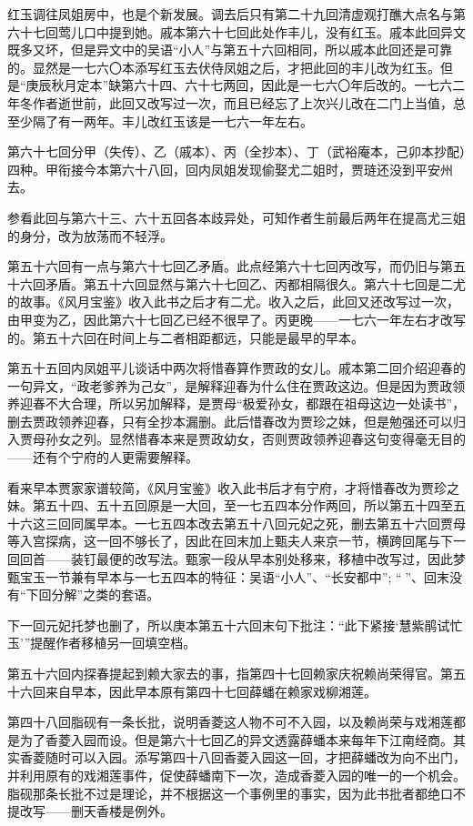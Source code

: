\par 红玉调往凤姐房中，也是个新发展。调去后只有第二十九回清虚观打醮大点名与第六十七回莺儿口中提到她。戚本第六十七回此处作丰儿，没有红玉。戚本此回异文既多又坏，但是异文中的吴语“小人”与第五十六回相同，所以戚本此回还是可靠的。显然是一七六〇本添写红玉去伏侍凤姐之后，才把此回的丰儿改为红玉。但是“庚辰秋月定本”缺第六十四、六十七两回，因此是一七六〇年后改的。一七六二年冬作者逝世前，此回又改写过一次，而且已经忘了上次兴儿改在二门上当值，总至少隔了有一两年。丰儿改红玉该是一七六一年左右。
\par 第六十七回分甲（失传）、乙（戚本）、丙（全抄本）、丁（武裕庵本，己卯本抄配）四种。甲衔接今本第六十八回，回内凤姐发现偷娶尤二姐时，贾琏还没到平安州去。
\par 参看此回与第六十三、六十五回各本歧异处，可知作者生前最后两年在提高尤三姐的身分，改为放荡而不轻浮。
\par 第五十六回有一点与第六十七回乙矛盾。此点经第六十七回丙改写，而仍旧与第五十六回矛盾。第五十六回显然与第六十七回乙、丙都相隔很久。第六十七回是二尤的故事。《风月宝鉴》收入此书之后才有二尤。收入之后，此回又还改写过一次，由甲变为乙，因此第六十七回乙已经不很早了。丙更晚——一七六一年左右才改写的。第五十六回在时间上与二者相距都远，只能是最早的早本。
\par 第五十五回内凤姐平儿谈话中两次将惜春算作贾政的女儿。戚本第二回介绍迎春的一句异文，“政老爹养为己女”，是解释迎春为什么住在贾政这边。但是因为贾政领养迎春不大合理，所以另加解释，是贾母“极爱孙女，都跟在祖母这边一处读书”，删去贾政领养迎春，只有全抄本漏删。此后惜春改为贾珍之妹，但是勉强还可以归入贾母孙女之列。显然惜春本来是贾政幼女，否则贾政领养迎春这句变得毫无目的——还有个宁府的人更需要解释。
\par 看来早本贾家家谱较简，《风月宝鉴》收入此书后才有宁府，才将惜春改为贾珍之妹。第五十四、五十五回原是一大回，至一七五四本分作两回，所以第五十四至五十六这三回同属早本。一七五四本改去第五十八回元妃之死，删去第五十六回贾母等入宫探病，这一回不够长了，因此在回末加上甄夫人来京一节，横跨回尾与下一回回首——装钉最便的改写法。甄家一段从早本别处移来，移植中改写过，因此梦甄宝玉一节兼有早本与一七五四本的特征：吴语“小人”、“长安都中”; “𤞘”、回末没有“下回分解”之类的套语。
\par 下一回元妃托梦也删了，所以庚本第五十六回末句下批注：“此下紧接‘慧紫鹃试忙玉’”提醒作者移植另一回填空档。
\par 第五十六回内探春提起到赖大家去的事，指第四十七回赖家庆祝赖尚荣得官。第五十六回来自早本，因此早本原有第四十七回薛蟠在赖家戏柳湘莲。
\par 第四十八回脂砚有一条长批，说明香菱这人物不可不入园，以及赖尚荣与戏湘莲都是为了香菱入园而设。但是第六十七回乙的异文透露薛蟠本来每年下江南经商。其实香菱随时可以入园。添写第四十八回香菱入园这一回，才把薛蟠改为向不出门，并利用原有的戏湘莲事件，促使薛蟠南下一次，造成香菱入园的唯一的一个机会。脂砚那条长批不过是理论，并不根据这一个事例里的事实，因为此书批者都绝口不提改写——删天香楼是例外。
